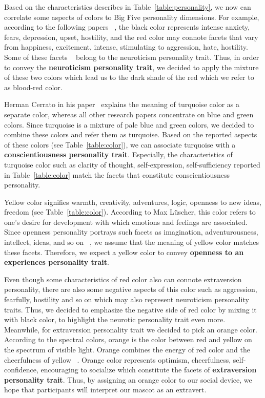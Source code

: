 Based on the characteristics describes in Table~\ref{table:personality},
we now can correlate some aspects of colors to Big Five personality dimensions.
For example, according to the following papers ~\cite{alschuler1943easel,schaie1961scaling},
the black color represents intense anxiety, fears, depression, upset, hostility, and the red color may
connote facets that vary from happiness, excitement, intense, stimulating to aggression, hate, hostility.
Some of these facets ~\cite{costa1988catalog} belong to the neuroticism personality trait.
Thus, in order to convey the \textbf{neuroticism personality trait}, we decided to apply the
mixture of these two colors which lead us to the dark shade of the red which we refer to as blood-red color.

Herman Cerrato in his paper~\cite{cerrato2012meaning} explains the meaning of turquoise color as a separate color, whereas
all other research papers concentrate on blue and green colors.
Since turquoise is a mixture of pale blue and green colors, we decided to combine
these colors and refer them as turquoise.
Based on the reported aspects of these colors (see Table~\ref{table:color}),
we can associate turquoise with a \textbf{conscientiousness personality trait}.
Especially, the characteristics of turquoise color such as clarity of thought,
self-expression, self-sufficiency reported in Table~\ref{table:color} match the
facets that constitute conscientiousness personality.

Yellow color signifies warmth, creativity, adventures, logic, openness to new
ideas, freedom (see Table~\ref{table:color}).
According to Max Lüscher, this color refers to one’s desire for development
with which emotions and feelings are associated.
Since openness personality portrays such facets as imagination, adventurousness, intellect, ideas,
and so on ~\cite{costa1988catalog}, we assume that the meaning of yellow color matches these facets.
Therefore, we expect a yellow color to convey \textbf{openness to an experiences personality trait}.

Even though some characteristics of red color also can connote extraversion personality,
there are also some negative aspects of this color such as aggression, fearfully,
hostility and so on which may also represent neuroticism personality traits.
Thus, we decided to emphasize the negative side of red color by mixing it with black color,
to highlight the neurotic personality trait even more.
Meanwhile, for extraversion personality trait we decided to pick an orange color.
According to the spectral colors, orange is the color between red and yellow on the spectrum of visible light.
Orange combines the energy of red color and the cheerfulness of yellow ~\cite{cerrato2012meaning}.
Orange color represents optimism, cheerfulness, self-confidence, encouraging
to socialize which constitute the facets of \textbf{extraversion personality trait}.
Thus, by assigning an orange color to our social device, we hope that
participants will interpret our mascot as an extravert.

